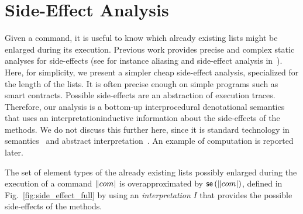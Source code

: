 \section{Side-Effect Analysis}\label{sec:side_effect}

Given a command, it is useful to know
which already existing lists might be enlarged during its execution.
Previous work provides precise and complex static analyses for side-effects
(see for instance aliasing and side-effect analysis in~\cite{SpotoMP10}).
Here, for simplicity, we present a simpler cheap side-effect analysis, specialized
for the length of the lists. It is often precise enough on simple programs such as smart contracts.
Possible side-effects are an abstraction of execution traces.
Therefore, our analysis is a bottom-up interprocedural
denotational semantics that uses an interpretation\ie inductive information about
the side-effects of the methods.
We do not discuss this further here, since it is standard technology
in semantics~\cite{Winskel93} and abstract interpretation~\cite{CousotC77}.
An example of computation is reported later.
%
\begin{definition}\label{def:side_effect}
  The set of element types of the already existing lists possibly enlarged during the
  execution of a command $\com$ is overapproximated by $\sideeffect{\com}$,
  defined in Fig.~\ref{fig:side_effect_full} by using an \emph{interpretation} $I$ that
  provides the possible side-effects of the methods.
\end{definition}
